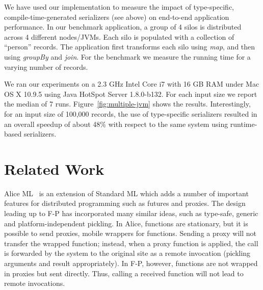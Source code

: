 \documentclass[preprint]{sigplanconf}
\theoremstyle{definition}
\theoremstyle{definition}
\begin{document}
We have used our implementation to measure the impact of type-specific,
compile-time-generated serializers (see above) on end-to-end application
performance. In our benchmark application, a group of 4 silos is distributed
across 4 different nodes/JVMs. Each silo is populated with a collection of
``person'' records. The application first transforms each silo using
\emph{map}, and then using \emph{groupBy} and \emph{join}. For the benchmark
we measure the running time for a varying number of records.

We ran our experiments on a 2.3 GHz Intel Core i7 with 16 GB RAM under Mac OS
X 10.9.5 using Java HotSpot Server 1.8.0-b132. For each input size we report
the median of 7 runs. Figure~\ref{fig:multiple-jvm} shows the results.
Interestingly, for an input size of 100,000 records, the use of type-specific
serializers resulted in an overall speedup of about 48\% with respect to the
same system using runtime-based serializers.




\section{Related Work}
\label{sec:related-work}

Alice ML~\cite{AliceML} is an extension of Standard ML which adds a number of
important features for distributed programming such as futures and proxies.
The design leading up to F-P has incorporated many similar ideas, such as
{type-safe}, generic and platform-independent pickling. In Alice, functions
are stationary, but it is possible to send proxies, mobile wrappers for
functions. Sending a proxy will not transfer the wrapped function; instead,
when a proxy function is applied, the call is forwarded by the system to the
original site as a remote invocation (pickling arguments and result
appropriately). In F-P, however, functions are not wrapped in proxies but sent
directly. Thus, calling a received function will not lead to remote
invocations.
\end{document}
